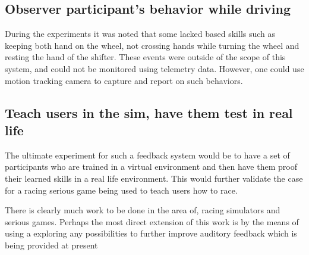 \subsection{Observer participant’s behavior while driving}
During the experiments it was noted that some lacked based skills such as keeping both hand on the wheel, not crossing hands while turning the wheel and resting the hand of the shifter. These events were outside of the scope of this system, and could not be monitored using telemetry data. However, one could use motion tracking camera to capture and report on such behaviors. 

\subsection{Teach users in the sim, have them test in real life}
The ultimate experiment for such a feedback system would be to have a set of participants who are trained in a virtual environment and then have them proof their learned skills in a real life environment. This would further validate the case for a racing serious game being used to teach users how to race.

There is clearly much work to be done in the area of, racing simulators and serious games. Perhaps the most direct extension of this work is by the means of using
a exploring any possibilities to further improve auditory feedback which is being provided at present 
